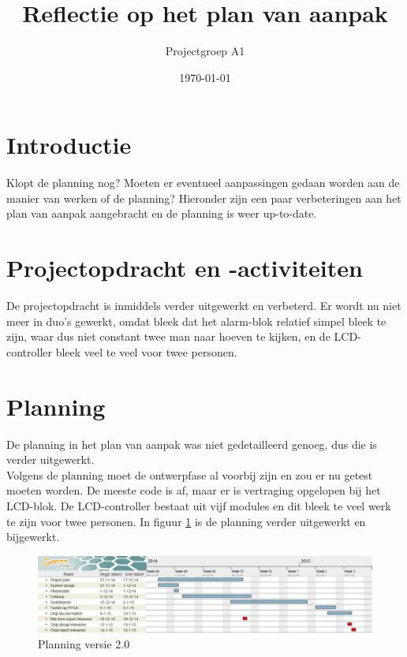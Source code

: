 \documentclass[11pt,twoside,a4paper]{article}
\begin{document}
\begin{centering}
\title{\textbf{Reflectie op het plan van aanpak}}
\author{Projectgroep A1}
\date{\today}

\maketitle
\end{centering}

\section{Introductie}
Klopt de planning nog? Moeten er eventueel aanpassingen gedaan worden aan de manier van werken of de planning? Hieronder zijn een paar verbeteringen aan het plan van aanpak aangebracht en de planning is weer up-to-date.

\section{Projectopdracht en -activiteiten}
De projectopdracht is inmiddels verder uitgewerkt en verbeterd. Er wordt nu niet meer in duo's gewerkt, omdat bleek dat het alarm-blok relatief simpel bleek te zijn, waar dus niet constant twee man naar hoeven te kijken, en de LCD-controller bleek veel te veel voor twee personen.

\section{Planning}
De planning in het plan van aanpak was niet gedetailleerd genoeg, dus die is verder uitgewerkt.\\
Volgens de planning moet de ontwerpfase al voorbij zijn en zou er nu getest moeten worden. De meeste code is af, maar er is vertraging opgelopen bij het LCD-blok. De LCD-controller bestaat uit vijf modules en dit bleek te veel werk te zijn voor twee personen. In figuur \ref{fig:planning} is de planning verder uitgewerkt en bijgewerkt.

\begin{figure}[h!]
\center
\includegraphics[width=15cm]{planning2}
\caption{Planning versie 2.0}
\label{fig:planning}
\end{figure}
\end{document}
